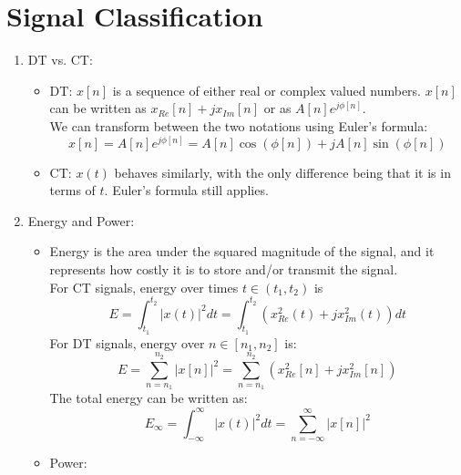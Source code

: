 \documentclass[nobib]{tufte-handout}
\begin{document}
\section{Signal Classification}
\begin{enumerate}
    \item DT vs. CT:\begin{itemize}
              \item DT: $x[n]$ is a sequence of either real or complex valued numbers. $x[n]$ can
                    be written as $x_{Re}[n]+jx_{Im}[n]$ or as $A[n]e^{j\phi[n]}$.\\ We can
                    transform between the two notations using Euler's formula:
                    \begin{equation*}
                        x[n] = A[n]e^{j\phi[n]} = A[n]\cos(\phi[n])+jA[n]\sin(\phi[n])
                    \end{equation*}
              \item CT: $x(t)$ behaves similarly, with the only difference being that it is in
                    terms of $t$. Euler's formula still applies.
          \end{itemize}
    \item Energy and Power: \begin{itemize}
              \item Energy is the area under the squared magnitude of the signal, and it represents
                    how costly it is to store and/or transmit the signal. \\For CT signals, energy
                    over times $t \in (t_1,t_2)$ is \begin{equation*}
                        E = \int_{t_1}^{t_2} |x(t)|^2 dt = \int_{t_1}^{t_2}(x_{Re}^2(t)+jx_{Im}^2(t)) dt
                    \end{equation*}
                    For DT signals, energy over $n \in [n_1,n_2]$ is:
                    \begin{equation*}
                        E = \sum_{n=n_1}^{n_2}|x[n]|^2 = \sum_{n=n_1}^{n_2}(x_{Re}^2[n]+jx_{Im}^2[n])
                    \end{equation*}
                    The total energy can be written as: \begin{equation*}
                        E_\infty = \int_{-\infty}^{\infty} |x(t)|^2 dt = \sum_{n = -\infty}^{\infty} |x[n]|^2
                    \end{equation*}
              \item Power: \\

\end{itemize}
\end{enumerate}
\end{document}
